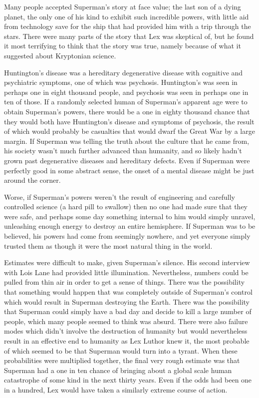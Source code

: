 \documentclass[ebook,12pt]{memoir}
\begin{document}
Many people accepted Superman's story at face value; the last son of a
dying planet, the only one of his kind to exhibit such incredible
powers, with little aid from technology save for the ship that had
provided him with a trip through the stars. There were many parts of the
story that Lex was skeptical of, but he found it most terrifying to
think that the story was true, namely because of what it suggested about
Kryptonian science.

Huntington's disease was a hereditary degenerative disease with
cognitive and psychiatric symptoms, one of which was psychosis.
Huntington's was seen in perhaps one in eight thousand people, and
psychosis was seen in perhaps one in ten of those. If a randomly
selected human of Superman's apparent age were to obtain Superman's
powers, there would be a one in eighty thousand chance that they would
both have Huntington's disease and symptoms of psychosis, the result of
which would probably be casualties that would dwarf the Great War by a
large margin. If Superman was telling the truth about the culture that
he came from, his society wasn't much further advanced than humanity,
and so likely hadn't grown past degenerative diseases and hereditary
defects. Even if Superman were perfectly good in some abstract sense,
the onset of a mental disease might be just around the corner.

Worse, if Superman's powers weren't the result of engineering and
carefully controlled science (a hard pill to swallow) then no one had
made sure that they were safe, and perhaps some day something internal
to him would simply unravel, unleashing enough energy to destroy an
entire hemisphere. If Superman was to be believed, his powers had come
from seemingly nowhere, and yet everyone simply trusted them as though
it were the most natural thing in the world.

Estimates were difficult to make, given Superman's silence. His second
interview with Lois Lane had provided little illumination. Nevertheless,
numbers could be pulled from thin air in order to get a sense of things.
There was the possibility that something would happen that was
completely outside of Superman's control which would result in Superman
destroying the Earth. There was the possibility that Superman could
simply have a bad day and decide to kill a large number of people, which
many people seemed to think was absurd. There were also failure modes
which didn't involve the destruction of humanity but would nevertheless
result in an effective end to humanity as Lex Luthor knew it, the most
probable of which seemed to be that Superman would turn into a tyrant.
When these probabilities were multiplied together, the final very rough
estimate was that Superman had a one in ten chance of bringing about a
global scale human catastrophe of some kind in the next thirty years.
Even if the odds had been one in a hundred, Lex would have taken a
similarly extreme course of action.
\end{document}
